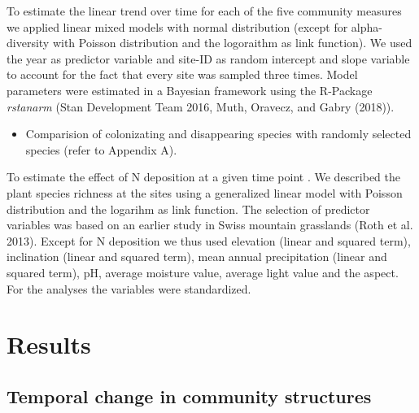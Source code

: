 \documentclass[fleqn,10pt,lineno]{wlpeerj} %
\providecommand{\tightlist}{
\setlength{\itemsep}{0pt}\setlength{\parskip}{0pt}}
\theoremstyle{definition}
\theoremstyle{definition}
\theoremstyle{definition}
\theoremstyle{remark}
\begin{document}
To estimate the linear trend over time for each of the five community
measures we applied linear mixed models with normal distribution (except
for alpha-diversity with Poisson distribution and the logoraithm as link
function). We used the year as predictor variable and site-ID as random
intercept and slope variable to account for the fact that every site was
sampled three times. Model parameters were estimated in a Bayesian
framework using the R-Package \emph{rstanarm} (Stan Development Team
2016, Muth, Oravecz, and Gabry (2018)).

\begin{itemize}
\tightlist
\item
  Comparision of colonizating and disappearing species with randomly
  selected species (refer to Appendix A).
\end{itemize}

To estimate the effect of N deposition at a given time point . We
described the plant species richness at the sites using a generalized
linear model with Poisson distribution and the logarihm as link
function. The selection of predictor variables was based on an earlier
study in Swiss mountain grasslands (Roth et al. 2013). Except for N
deposition we thus used elevation (linear and squared term), inclination
(linear and squared term), mean annual precipitation (linear and squared
term), pH, average moisture value, average light value and the aspect.
For the analyses the variables were standardized.

\section*{Results}\label{results}

\subsection*{Temporal change in community
structures}\label{temporal-change-in-community-structures}
\end{document}
